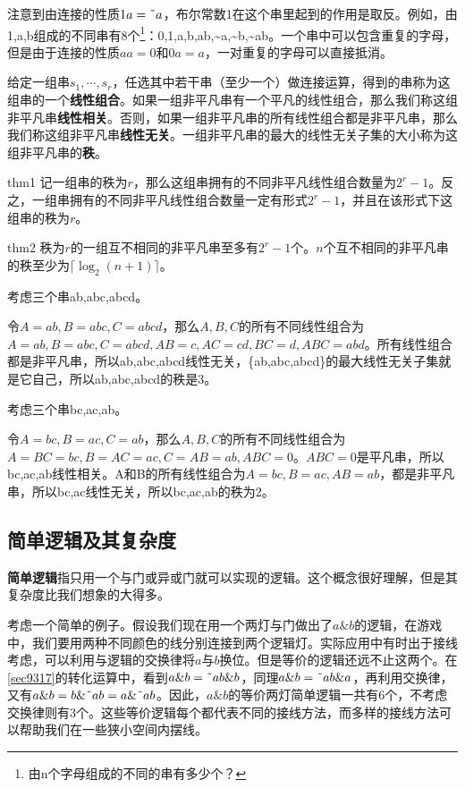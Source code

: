 注意到由连接的性质$1a=\textrm{\~{}} a$，布尔常数1在这个串里起到的作用是取反。例如，由1,a,b组成的不同串有8个\footnote{由n个字母组成的不同的串有多少个？}：0,1,a,b,ab,\~{}a,\~{}b,\~{}ab。一个串中可以包含重复的字母，但是由于连接的性质$aa=0$和$0a=a$，一对重复的字母可以直接抵消。

给定一组串$s_1,\cdots,s_r$，任选其中若干串（至少一个）做连接运算，得到的串称为这组串的一个\textbf{线性组合}。如果一组非平凡串有一个平凡的线性组合，那么我们称这组非平凡串\textbf{线性相关}。否则，如果一组非平凡串的所有线性组合都是非平凡串，那么我们称这组非平凡串\textbf{线性无关}。一组非平凡串的最大的线性无关子集的大小称为这组非平凡串的\textbf{秩}。
\begin{theorem}{}{thm1}
记一组串的秩为$r$，那么这组串拥有的不同非平凡线性组合数量为$2^r-1$。反之，一组串拥有的不同非平凡线性组合数量一定有形式$2^r-1$，并且在该形式下这组串的秩为$r$。
\end{theorem}
\begin{corollary}{}{thm2}
秩为$r$的一组互不相同的非平凡串至多有$2^r-1$个。$n$个互不相同的非平凡串的秩至少为$\lceil\log_2 (n+1)\rceil$。
\end{corollary}

\begin{example}
考虑三个串ab,abc,abcd。

令$A=ab,B=abc,C=abcd$，那么$A,B,C$的所有不同线性组合为$A=ab,B=abc,C=abcd,AB=c,AC=cd,BC=d,ABC=abd$。所有线性组合都是非平凡串，所以ab,abc,abcd线性无关，\{ab,abc,abcd\}的最大线性无关子集就是它自己，所以ab,abc,abcd的秩是3。
\end{example}

\begin{example}
考虑三个串bc,ac,ab。

令$A=bc,B=ac,C=ab$，那么$A,B,C$的所有不同线性组合为$A=BC=bc,B=AC=ac,C=AB=ab,ABC=0$。$ABC=0$是平凡串，所以bc,ac,ab线性相关。A和B的所有线性组合为$A=bc,B=ac,AB=ab$，都是非平凡串，所以bc,ac线性无关，所以bc,ac,ab的秩为2。
\end{example}

\subsection{简单逻辑及其复杂度}
\textbf{简单逻辑}指只用一个与门或异或门就可以实现的逻辑。这个概念很好理解，但是其复杂度比我们想象的大得多。

考虑一个简单的例子。假设我们现在用一个两灯与门做出了$a\&b$的逻辑，在游戏中，我们要用两种不同颜色的线分别连接到两个逻辑灯。实际应用中有时出于接线考虑，可以利用与逻辑的交换律将$a$与$b$换位。但是等价的逻辑还远不止这两个。在\autoref{sec9317}的转化运算中，看到$a\&b=\textrm{\~{}} ab\&b$，同理$a\&b=\textrm{\~{}} ab\&a$，再利用交换律，又有$a\&b=b\&\textrm{\~{}} ab=a\&\textrm{\~{}} ab$。因此，$a\&b$的等价两灯简单逻辑一共有6个，不考虑交换律则有3个。这些等价逻辑每个都代表不同的接线方法，而多样的接线方法可以帮助我们在一些狭小空间内摆线。

